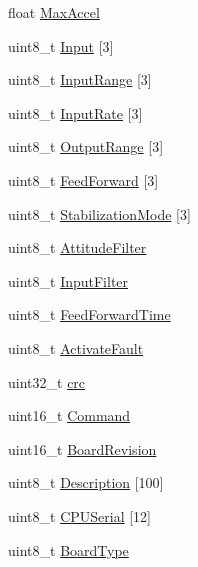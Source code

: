 \begin{DoxyCompactItemize}
float \hyperlink{struct____attribute_____a894fe83435d7d83be6d314fd45cfba97}{\-Max\-Accel}
\item 
uint8\-\_\-t \hyperlink{struct____attribute_____a7d81963193cb97763c41a895ce04c60f}{\-Input} \mbox{[}3\mbox{]}
\item 
uint8\-\_\-t \hyperlink{struct____attribute_____acc52565138c477dc20d1050ed4cd6084}{\-Input\-Range} \mbox{[}3\mbox{]}
\item 
uint8\-\_\-t \hyperlink{struct____attribute_____ad477f87dda5a05f08d7b2e9e60e43d66}{\-Input\-Rate} \mbox{[}3\mbox{]}
\item 
uint8\-\_\-t \hyperlink{struct____attribute_____a3912a57d03d6b1404cadaca80f12b2b6}{\-Output\-Range} \mbox{[}3\mbox{]}
\item 
uint8\-\_\-t \hyperlink{struct____attribute_____a24cfdad488d1a6d10171eb8e81b7d8db}{\-Feed\-Forward} \mbox{[}3\mbox{]}
\item 
uint8\-\_\-t \hyperlink{struct____attribute_____ac3fd3464f708b6c06c34461c5a74a97e}{\-Stabilization\-Mode} \mbox{[}3\mbox{]}
\item 
uint8\-\_\-t \hyperlink{struct____attribute_____a1ddf626b63ed6add48beafc2d9b5d47e}{\-Attitude\-Filter}
\item 
uint8\-\_\-t \hyperlink{struct____attribute_____a77da07d5a4b8176a7ea291dda3f87170}{\-Input\-Filter}
\item 
uint8\-\_\-t \hyperlink{struct____attribute_____ab1a9990587c4dfa9b74466bf169ae8e4}{\-Feed\-Forward\-Time}
\item 
uint8\-\_\-t \hyperlink{struct____attribute_____a7e0c61f60d83022eba472d798f7fa929}{\-Activate\-Fault}
\item 
uint32\-\_\-t \hyperlink{struct____attribute_____a50e0d9114a2d620537f5cf9f71114be6}{crc}
\item 
uint16\-\_\-t \hyperlink{struct____attribute_____af7007d29612482dce21e79e4db0fd2b8}{\-Command}
\item 
uint16\-\_\-t \hyperlink{struct____attribute_____a066bbda6728d120286459266f836a9e5}{\-Board\-Revision}
\item 
uint8\-\_\-t \hyperlink{struct____attribute_____ac86e7615537064e90f754644d6f1e796}{\-Description} \mbox{[}100\mbox{]}
\item 
uint8\-\_\-t \hyperlink{struct____attribute_____a09520bec9d958c9910ce76b01c7885b0}{\-C\-P\-U\-Serial} \mbox{[}12\mbox{]}
\item 
uint8\-\_\-t \hyperlink{struct____attribute_____aa1c2b455eb4cbdda923ac671d58a9335}{\-Board\-Type}
\item 

\end{DoxyCompactItemize}
